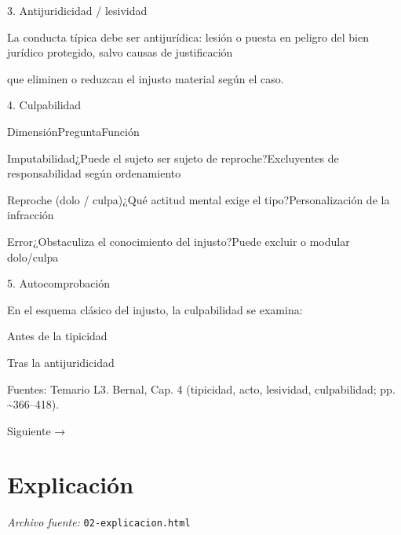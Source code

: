 \documentclass[11pt,a4paper]{article}
\begin{document}
      3. Antijuridicidad / lesividad\par


        La conducta típica debe ser antijurídica: lesión o puesta en peligro del bien jurídico protegido, salvo causas de justificación\par
        que eliminen o reduzcan el injusto material según el caso.\par





      4. Culpabilidad\par



          DimensiónPreguntaFunción\par




          Imputabilidad¿Puede el sujeto ser sujeto de reproche?Excluyentes de responsabilidad según ordenamiento\par

          Reproche (dolo / culpa)¿Qué actitud mental exige el tipo?Personalización de la infracción\par

          Error¿Obstaculiza el conocimiento del injusto?Puede excluir o modular dolo/culpa\par








      5. Autocomprobación\par

      En el esquema clásico del injusto, la culpabilidad se examina:\par

      Antes de la tipicidad\par
      Tras la antijuridicidad\par





      Fuentes: Temario L3. Bernal, Cap. 4 (tipicidad, acto, lesividad, culpabilidad; pp. \textasciitilde{}366–418).\par


    Siguiente →\par

\section{Explicaci\'on}
\noindent\textit{Archivo fuente:} \texttt{02-explicacion.html}
\end{document}
